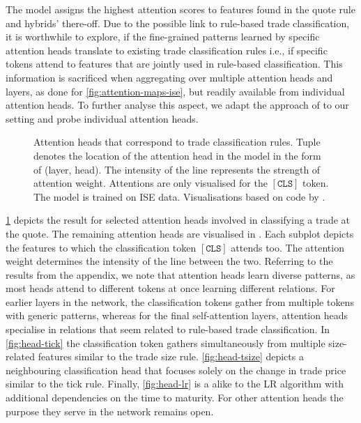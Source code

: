 The model assigns the highest attention scores to features found in the quote rule and hybrids' there-off. Due to the possible link to rule-based trade classification, it is worthwhile to explore, if the fine-grained patterns learned by specific attention heads translate to existing trade classification rules i.e., if specific tokens attend to features that are jointly used in rule-based classification. This information is sacrificed when aggregating over multiple attention heads and layers, as done for \cref{fig:attention-maps-ise}, but readily available from individual attention heads. To further analyse this aspect, we adapt the approach of \textcite[][4]{clarkWhatDoesBERT2019} to our setting and probe individual attention heads.

\begin{figure}[h!]
    \hfill
    \hfill
    \caption[Attention Heads That Correspond To Trade Classification Rules]{Attention heads that correspond to trade classification rules. Tuple denotes the location of the attention head in the model in the form of (layer, head). The intensity of the line represents the strength of attention weight. Attentions are only visualised for the $\mathtt{[CLS]}$ token. The model is trained on \gls{ISE} data. Visualisations based on code by \textcite[][4]{clarkWhatDoesBERT2019}.}
    \label{fig:rule-like-attention-heads}
\end{figure}

\cref{fig:rule-like-attention-heads} depicts the result for selected attention heads involved in classifying a trade at the quote. The remaining attention heads are visualised in . Each subplot depicts the features to which the classification token $\mathtt{[CLS]}$ attends too. The attention weight determines the intensity of the line between the two. Referring to the results from the appendix, we note that attention heads learn diverse patterns, as most heads attend to different tokens at once learning different relations. For earlier layers in the network, the classification tokens gather from multiple tokens with generic patterns, whereas for the final self-attention layers, attention heads specialise in relations that seem related to rule-based trade classification. In \cref{fig:head-tick} the classification token gathers simultaneously from multiple size-related features similar to the trade size rule. \cref{fig:head-tsize} depicts a neighbouring classification head that focuses solely on the change in trade price similar to the tick rule. Finally, \cref{fig:head-lr} is a alike to the \gls{LR} algorithm with additional dependencies on the time to maturity. For other attention heads the purpose they serve in the network remains open. 

